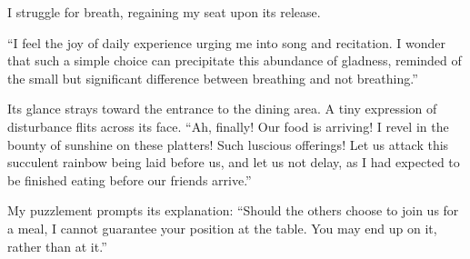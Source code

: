 I struggle for breath, regaining my seat upon its release.

``I feel the joy of daily experience urging me into song and recitation.
I wonder that such a simple choice can precipitate this abundance of
gladness,
reminded of the small but significant difference between breathing and
not breathing.''

Its glance strays toward the entrance to the dining area. A tiny
expression of disturbance flits across its face.
``Ah, finally! Our food is arriving!
I revel in the bounty of sunshine on these platters! Such luscious
offerings!
Let us attack this succulent rainbow being laid before us,
and let us not delay, as I had expected to be finished eating before our
friends arrive.''

My puzzlement prompts its explanation: 
``Should the others choose to join us for a meal, I cannot guarantee your
position at the table. You may end up on it, rather than at it.''
